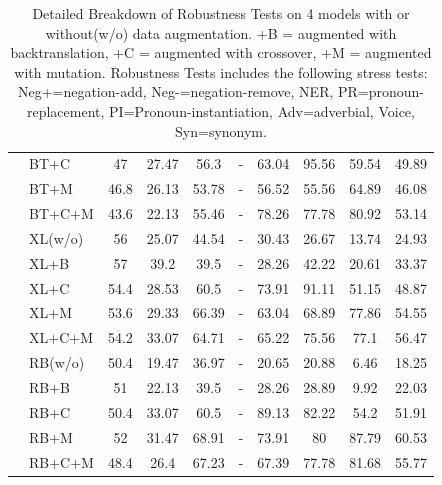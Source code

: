 \documentclass[11pt,a4paper]{article}
\begin{document}
\begin{table}[th]
\begin{tabular}{ll|c|ccccccc}
&BT+C&47&27.47&56.3&-&63.04&95.56&59.54&49.89 \\
&BT+M&46.8&26.13&53.78&-&56.52&55.56&64.89&46.08 \\
&BT+C+M&43.6&22.13&55.46&-&78.26&77.78&80.92&53.14 \\
\cline{2-10} 
&XL(w/o)&56&25.07&44.54&-&30.43&26.67&13.74&24.93 \\
&XL+B&57&39.2&39.5&-&28.26&42.22&20.61&33.37 \\
&XL+C&54.4&28.53&60.5&-&73.91&91.11&51.15&48.87 \\
&XL+M&53.6&29.33&66.39&-&63.04&68.89&77.86&54.55 \\
&XL+C+M&54.2&33.07&64.71&-&65.22&75.56&77.1&56.47 \\
\cline{2-10} 
&RB(w/o)&50.4&19.47&36.97&-&20.65&20.88&6.46&18.25 \\
&RB+B&51&22.13&39.5&-&28.26&28.89&9.92&22.03 \\
&RB+C&50.4&33.07&60.5&-&89.13&82.22&54.2&51.91 \\
&RB+M&52&31.47&68.91&-&73.91&80&87.79&60.53 \\
&RB+C+M&48.4&26.4&67.23&-&67.39&77.78&81.68&55.77 \\

\bottomrule
\hline
\end{tabular}
\caption{\label{tab:results} Detailed Breakdown of Robustness Tests
on 4 models with or without(w/o) data augmentation. 
+B = augmented with backtranslation,
+C = augmented with crossover, +M = augmented with mutation. 
Robustness Tests includes the following stress tests: 
Neg+=negation-add, Neg-=negation-remove, NER, 
PR=pronoun-replacement, PI=Pronoun-instantiation, Adv=adverbial, Voice, Syn=synonym.}
\end{table}
\end{document}
